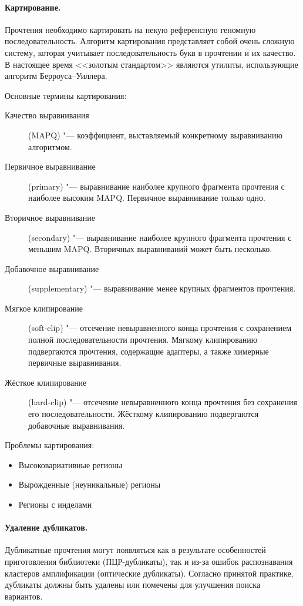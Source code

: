 \documentclass[a4paper,12pt]{article}
\begin{document}
\paragraph{Картирование.}
Прочтения необходимо картировать на некую референсную геномную последовательность.
Алгоритм картирования представляет собой очень сложную систему, которая учитывает последовательность букв в прочтении и их качество.
В настоящее время <<золотым стандартом>> являются утилиты, использующие алгоритм Берроуса--Уиллера\cite{burrows}.

Основные термины картирования:

\begin{description}
\item[Качество выравнивания] (MAPQ) "--- коэффициент, выставляемый конкретному выравниванию алгоритмом.
\item[Первичное выравнивание] (primary) "--- выравнивание наиболее крупного фрагмента прочтения с наиболее высоким MAPQ.
Первичное выравнивание только одно.
\item[Вторичное выравнивание] (secondary) "--- выравнивание наиболее крупного фрагмента прочтения с меньшим MAPQ.
Вторичных выравниваний может быть несколько.
\item[Добавочное выравнивание] (supplementary) "--- выравнивание менее крупных фрагментов прочтения.
\item[Мягкое клипирование] (soft-clip) "--- отсечение невыравненного конца прочтения с сохранением полной последовательности прочтения.
Мягкому клипированию подвергаются прочтения, содержащие адаптеры, а также химерные первичные выравнивания.
\item[Жёсткое клипирование] (hard-clip) "--- отсечение невыравненного конца прочтения без сохранения его последовательности.
Жёсткому клипированию подвергаются добавочные выравнивания.
\end{description}

Проблемы картирования:

\begin{itemize}
\item Высоковариативные регионы
\item Вырожденные (неуникальные) регионы
\item Регионы с инделами
\end{itemize}

\paragraph{Удаление дубликатов.}
Дубликатные прочтения могут появляться как в результате особенностей приготовления библиотеки (ПЦР-дубликаты), так и из-за ошибок распознавания кластеров амплификации (оптические дубликаты).
Согласно принятой практике, дубликаты должны быть удалены или помечены для улучшения поиска вариантов\cite{gatk}.
\end{document}
